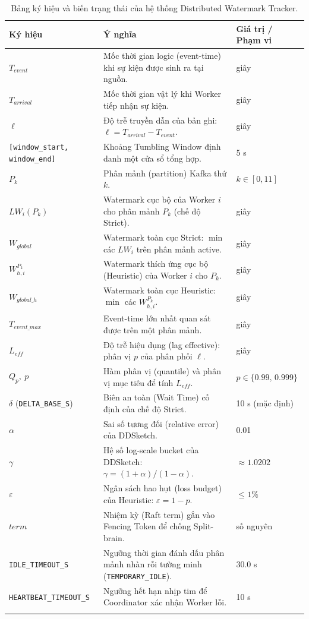 \documentclass[12pt,a4paper]{article}
\begin{document}
\begin{longtable}{p{} p{} p{}}
\toprule
\textbf{Ký hiệu} & \textbf{Ý nghĩa} & \textbf{Giá trị / Phạm vi} \\
\midrule
\endhead
$T_{event}$ & Mốc thời gian logic (event-time) khi sự kiện được sinh ra tại nguồn. & giây \\
$T_{arrival}$ & Mốc thời gian vật lý khi Worker tiếp nhận sự kiện. & giây \\
$\ell$ & Độ trễ truyền dẫn của bản ghi: $\ell = T_{arrival} - T_{event}$. & giây \\
\texttt{[window\_start, window\_end]} & Khoảng Tumbling Window định danh một cửa sổ tổng hợp. & 5 s \\
$P_k$ & Phân mảnh (partition) Kafka thứ $k$. & $k \in [0, 11]$ \\
$LW_i(P_k)$ & Watermark cục bộ của Worker $i$ cho phân mảnh $P_k$ (chế độ Strict). & giây \\
$W_{global}$ & Watermark toàn cục Strict: $\min$ các $LW_i$ trên phân mảnh active. & giây \\
$W_{h,i}^{P_k}$ & Watermark thích ứng cục bộ (Heuristic) của Worker $i$ cho $P_k$. & giây \\
$W_{global\_h}$ & Watermark toàn cục Heuristic: $\min$ các $W_{h,i}^{P_k}$. & giây \\
$T_{event\_max}$ & Event-time lớn nhất quan sát được trên một phân mảnh. & giây \\
$L_{eff}$ & Độ trễ hiệu dụng (lag effective): phân vị $p$ của phân phối $\ell$. & giây \\
$Q_p,\ p$ & Hàm phân vị (quantile) và phân vị mục tiêu để tính $L_{eff}$. & $p \in \{0.99,\, 0.999\}$ \\
$\delta$ (\texttt{DELTA\_BASE\_S}) & Biên an toàn (Wait Time) cố định của chế độ Strict. & 10 s (mặc định) \\
$\alpha$ & Sai số tương đối (relative error) của DDSketch. & 0.01 \\
$\gamma$ & Hệ số log-scale bucket của DDSketch: $\gamma = (1+\alpha)/(1-\alpha)$. & $\approx 1.0202$ \\
$\varepsilon$ & Ngân sách hao hụt (loss budget) của Heuristic: $\varepsilon = 1 - p$. & $\le 1\%$ \\
$term$ & Nhiệm kỳ (Raft term) gắn vào Fencing Token để chống Split-brain. & số nguyên \\
\texttt{IDLE\_TIMEOUT\_S} & Ngưỡng thời gian đánh dấu phân mảnh nhàn rỗi tường minh (\texttt{TEMPORARY\_IDLE}). & 30.0 s \\
\texttt{HEARTBEAT\_TIMEOUT\_S} & Ngưỡng hết hạn nhịp tim để Coordinator xác nhận Worker lỗi. & 10 s \\
\bottomrule
\caption{Bảng ký hiệu và biến trạng thái của hệ thống Distributed Watermark Tracker.}
\label{tab:glossary}
\end{longtable}
\end{document}
